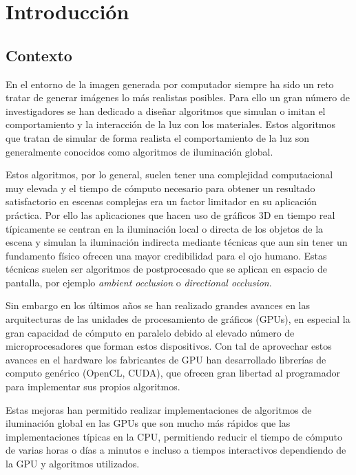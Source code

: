 \chapter{Introducción}

\section{Contexto}

En el entorno de la imagen generada por computador siempre ha sido un reto tratar de generar imágenes lo más realistas posibles. Para ello un gran número de investigadores se han dedicado a diseñar algoritmos que simulan o imitan el comportamiento y la interacción de la luz con los materiales. Estos algoritmos que tratan de simular de forma realista el comportamiento de la luz son generalmente conocidos como algoritmos de iluminación global.

\medskip

Estos algoritmos, por lo general, suelen tener una complejidad computacional muy elevada y el tiempo de cómputo necesario para obtener un resultado satisfactorio en escenas complejas era un factor limitador en su aplicación práctica. Por ello las aplicaciones que hacen uso de gráficos 3D en tiempo real típicamente se centran en la iluminación local o directa de los objetos de la escena y simulan la iluminación indirecta mediante técnicas que aun sin tener un fundamento físico ofrecen una mayor credibilidad para el ojo humano. Estas técnicas suelen ser algoritmos de postprocesado que se aplican en espacio de pantalla, por ejemplo \emph{ambient occlusion} o \emph{directional occlusion}. 

\medskip

Sin embargo en los últimos años se han realizado grandes avances en las arquitecturas de las unidades de procesamiento de gráficos (GPUs), en especial la gran capacidad de cómputo en paralelo debido al elevado número de microprocesadores que forman estos dispositivos. Con tal de aprovechar estos avances en el hardware los fabricantes de GPU han desarrollado librerías de computo genérico (OpenCL, CUDA), que ofrecen gran libertad al programador para implementar sus propios algoritmos.

\medskip

Estas mejoras han permitido realizar implementaciones de algoritmos de iluminación global en las GPUs que son mucho más rápidos que las implementaciones típicas en la CPU, permitiendo reducir el tiempo de cómputo de varias horas o días a minutos e incluso a tiempos interactivos dependiendo de la GPU y algoritmos utilizados.

